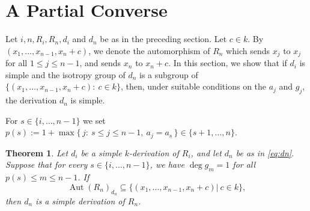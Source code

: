 \documentclass[11pt]{amsart}
\newtheorem{theorem}{Theorem}[section]
\theoremstyle{definition}
\theoremstyle{remark}
\numberwithin{equation}{theorem}
\newcommand{\Aut}{\operatorname{Aut}}
\begin{document}
\section{A Partial Converse}

Let $i,n,R_i,R_n,d_i$ and $d_n$ be as in the preceding section. Let $c\in k$. By $(x_1,\dots,x_{n-1},x_n+c)$, we denote the automorphism of $R_n$ which sends $x_j$ to $x_j$ for all $1\leq j \leq n-1$, and sends $x_n$ to $x_n+c$. In this section, we show that if $d_i$ is
simple and the isotropy group of $d_n$ is a subgroup of $\{(x_1,\dots,x_{n-1},x_n+c):\ c\in k\}$, then, under
suitable conditions on the $a_j$ and $g_j$, the derivation $d_n$ is simple.

For $s\in\{i,\dots,n-1\}$ we set $p(s):=1+\max\{\,j:\ s\le j\le n-1,\ a_j=a_s\,\}\in\{s+1,\dots,n\}.$
\begin{theorem}\label{thm:converse}
Let $d_i$ be a simple $k$-derivation of $R_i$, and let $d_n$ be as in \eqref{eq:dn}. Suppose that for every
$s\in\{i,\dots,n-1\}$, we have $\deg g_m=1$ for all $p(s)\le m\le n-1$. If
\[
\Aut(R_n)_{d_n}\subseteq\{(x_1,\dots,x_{n-1},x_n+c)|\ c\in k\},
\]
then $d_n$ is a simple derivation of $R_n$.
\end{theorem}
\end{document}

